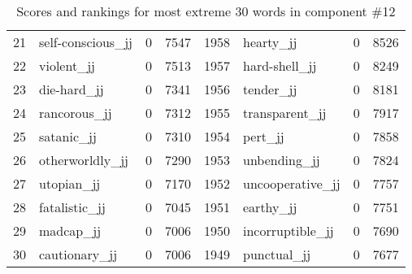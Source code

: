 \begin{table}[tbp]
\begin{tabular}{| rlr@{.}l | rlr@{.}l |}
    21 & self-conscious\_jj & 0 & 7547    &    1958 & hearty\_jj & 0 & 8526 \\
    22 & violent\_jj & 0 & 7513    &    1957 & hard-shell\_jj & 0 & 8249 \\
    23 & die-hard\_jj & 0 & 7341    &    1956 & tender\_jj & 0 & 8181 \\
    24 & rancorous\_jj & 0 & 7312    &    1955 & transparent\_jj & 0 & 7917 \\
    25 & satanic\_jj & 0 & 7310    &    1954 & pert\_jj & 0 & 7858 \\
    26 & otherworldly\_jj & 0 & 7290    &    1953 & unbending\_jj & 0 & 7824 \\
    27 & utopian\_jj & 0 & 7170    &    1952 & uncooperative\_jj & 0 & 7757 \\
    28 & fatalistic\_jj & 0 & 7045    &    1951 & earthy\_jj & 0 & 7751 \\
    29 & madcap\_jj & 0 & 7006    &    1950 & incorruptible\_jj & 0 & 7690 \\
    30 & cautionary\_jj & 0 & 7006    &    1949 & punctual\_jj & 0 & 7677 \\
    \hline
    \end{tabular}
    \caption{Scores and rankings for most extreme 30 words in component \#12} 
\end{table}
\clearpage
